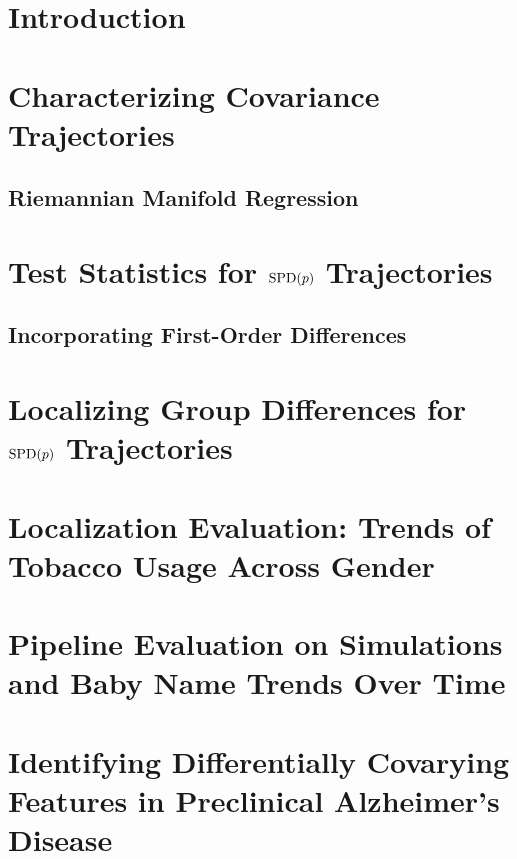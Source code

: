 \documentclass{qam-l}
\theoremstyle{definition}
\theoremstyle{remark}
\numberwithin{equation}{section}
\begin{document}
\date{}

\dedicatory{}

\begin{abstract}

\end{abstract}

\maketitle

\section{Introduction}

\section{Characterizing Covariance Trajectories}
\label{sec:mglm}

\subsection{Riemannian Manifold Regression}

\section{Test Statistics for $\text{SPD}(p)$ Trajectories}
\label{sec:hyp-test}

\subsection{Incorporating First-Order Differences}

\section{Localizing Group Differences for $\text{SPD}(p)$ Trajectories}
\label{sec:loc}

\section{Localization Evaluation: Trends of Tobacco Usage Across Gender}
\label{sec:loceval}

\section{Pipeline Evaluation on Simulations and Baby Name Trends Over Time}
\label{sec:pipeval}

\section{Identifying Differentially Covarying Features in Preclinical Alzheimer's Disease}
\label{sec:wrap}

\end{document}
